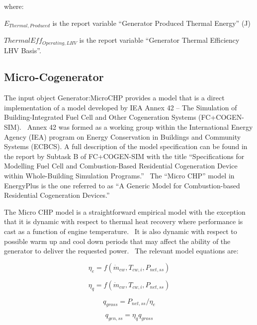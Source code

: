 where:

\({E_{Thermal,Produced}}\) is the report variable ``Generator Produced Thermal Energy'' (J)

\(ThermalEf{f_{Operating,LHV}}\) is the report variable ``Generator Thermal Efficiency LHV Basis''.

\subsection{Micro-Cogenerator}\label{micro-cogenerator}

The input object Generator:MicroCHP provides a model that is a direct implementation of a model developed by IEA Annex 42 -- The Simulation of Building-Integrated Fuel Cell and Other Cogeneration Systems (FC+COGEN-SIM).~ Annex 42 was formed as a working group within the International Energy Agency (IEA) program on Energy Conservation in Buildings and Community Systems (ECBCS). A full description of the model specification can be found in the report by Subtask B of FC+COGEN-SIM with the title ``Specifications for Modelling Fuel Cell and Combustion-Based Residential Cogeneration Device within Whole-Building Simulation Programs.''~ The ``Micro CHP'' model in EnergyPlus is the one referred to as ``A Generic Model for Combustion-based Residential Cogeneration Devices.''

The Micro CHP model is a straightforward empirical model with the exception that it is dynamic with respect to thermal heat recovery where performance is cast as a function of engine temperature.~ It is also dynamic with respect to possible warm up and cool down periods that may affect the ability of the generator to deliver the requested power.~ The relevant model equations are:

\begin{equation}
{\eta_e} = f({\dot m_{cw}},{T_{cw,i}},{P_{net,ss}})
\end{equation}

\begin{equation}
{\eta_q} = f({\dot m_{cw}},{T_{cw,i}},{P_{net,ss}})
\end{equation}

\begin{equation}
{q_{gross}} = {P_{net,ss}}/{\eta_e}
\end{equation}

\begin{equation}
{q_{gen,ss}} = {\eta_q}{q_{gross}}
\end{equation}

